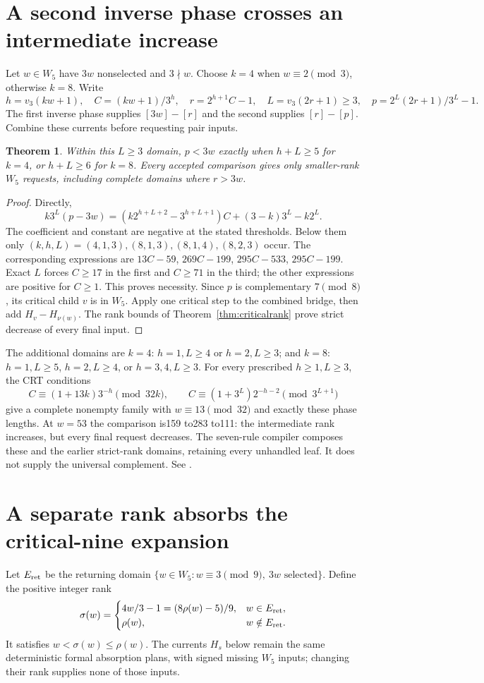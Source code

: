 \documentclass[11pt]{article}
\newtheorem{theorem}{Theorem}
\begin{document}
\section{A second inverse phase crosses an intermediate increase}
Let $w\in W_5$ have $3w$ nonselected and $3\nmid w$. Choose $k=4$
when $w\equiv2\pmod3$, otherwise $k=8$. Write
\[
 h=v_3(kw+1),\quad C=(kw+1)/3^h,\quad
 r=2^{h+1}C-1,\quad L=v_3(2r+1)\ge3,\quad
 p=2^L(2r+1)/3^L-1.
\]
The first inverse phase supplies $[3w]-[r]$ and the second supplies
$[r]-[p]$. Combine these currents before requesting pair inputs.

\begin{theorem}\label{thm:doubleinverse}
Within this $L\ge3$ domain, $p<3w$ exactly when
$h+L\ge5$ for $k=4$, or $h+L\ge6$ for $k=8$.
Every accepted comparison gives only smaller-rank $W_5$ requests,
including complete domains where $r>3w$.
\end{theorem}
\begin{proof}
Directly,
\[
 k3^L(p-3w)=(k2^{h+L+2}-3^{h+L+1})C+(3-k)3^L-k2^L.
\]
The coefficient and constant are negative at the stated thresholds.
Below them only $(k,h,L)=(4,1,3),(8,1,3),(8,1,4),(8,2,3)$ occur.
The corresponding expressions are $13C-59$, $269C-199$, $295C-533$,
$295C-199$. Exact $L$ forces $C\ge17$ in the first and $C\ge71$ in
the third; the other expressions are positive for $C\ge1$. This proves
necessity. Since $p$ is complementary $7\pmod8$, its critical child
$v$ is in $W_5$. Apply one critical step to the combined bridge, then
add $H_v-H_{\nu(w)}$. The rank bounds of
Theorem~\ref{thm:criticalrank} prove strict decrease of every final input.
\end{proof}

The additional domains are $k=4$: $h=1,L\ge4$ or $h=2,L\ge3$;
and $k=8$: $h=1,L\ge5$, $h=2,L\ge4$, or $h=3,4,L\ge3$.
For every prescribed $h\ge1,L\ge3$, the CRT conditions
\[
 C\equiv(1+13k)3^{-h}\pmod{32k},\qquad
 C\equiv(1+3^L)2^{-h-2}\pmod{3^{L+1}}
\]
give a complete nonempty family with $w\equiv13\pmod{32}$ and exactly
these phase lengths. At $w=53$ the comparison is159 to283 to111:
the intermediate rank increases, but every final request decreases.
The seven-rule compiler composes these and the earlier strict-rank domains,
retaining every unhandled leaf. It does not supply the universal complement.
See .

\section{A separate rank absorbs the critical-nine expansion}
Let $E_{\rm ret}$ be the returning domain
$\{w\in W_5:w\equiv3\pmod9,\ 3w\text{ selected}\}$. Define the positive
integer rank
\[
 \sigma(w)=\begin{cases}
 4w/3-1=(8\rho(w)-5)/9,&w\in E_{\rm ret},\\
 \rho(w),&w\notin E_{\rm ret}.
 \end{cases}
\]
It satisfies $w<\sigma(w)\le\rho(w)$. The currents $H_s$ below remain
the same deterministic formal absorption plans, with signed missing
$W_5$ inputs; changing their rank supplies none of those inputs.
\end{document}
